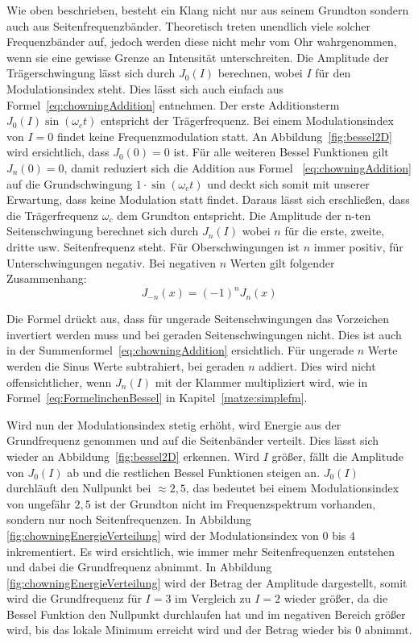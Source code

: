 Wie oben beschrieben, besteht ein Klang nicht nur aus seinem Grundton sondern auch aus Seitenfrequenzbänder. Theoretisch treten unendlich viele solcher Frequenzbänder auf, jedoch werden diese nicht mehr vom Ohr wahrgenommen, wenn sie eine gewisse Grenze an Intensität unterschreiten. Die Amplitude der Trägerschwingung lässt sich durch $J_0(I)$ berechnen, wobei $I$ für den Modulationsindex steht. Dies lässt sich auch einfach aus Formel~\ref{eq:chowningAddition} entnehmen. Der erste Additionsterm $J_0(I)\sin(\omega_c t)$ entspricht der Trägerfrequenz. Bei einem Modulationsindex von $I=0$ findet keine Frequenzmodulation statt. An Abbildung~\ref{fig:bessel2D} wird ersichtlich, dass $J_0(0)=0$ ist. Für alle weiteren Bessel Funktionen gilt $J_n(0)=0$, damit reduziert sich die Addition aus Formel~ \ref{eq:chowningAddition} auf die Grundschwingung $1\cdot\sin(\omega_c t)$ und deckt sich somit mit unserer Erwartung, dass keine Modulation statt findet. Daraus lässt sich erschließen, dass die Trägerfrequenz $\omega_c$ dem Grundton entspricht. Die Amplitude der n-ten Seitenschwingung berechnet sich durch $J_n(I)$ wobei $n$ für die erste, zweite, dritte usw. Seitenfrequenz steht. Für Oberschwingungen ist $n$ immer positiv, für Unterschwingungen negativ. Bei negativen $n$ Werten gilt folgender Zusammenhang: \cite[S. 223]{temme}
\begin{equation*}
J_{-n}(x)=(-1)^nJ_n(x)
\end{equation*}

Die Formel drückt aus, dass für ungerade Seitenschwingungen das Vorzeichen invertiert werden muss und bei geraden Seitenschwingungen nicht. Dies ist auch in der Summenformel~\ref{eq:chowningAddition} ersichtlich. Für ungerade $n$ Werte werden die Sinus Werte subtrahiert, bei geraden $n$ addiert. Dies wird nicht offensichtlicher, wenn $J_n(I)$ mit der Klammer multipliziert wird, wie in Formel~\ref{eq:FormelinchenBessel} in Kapitel~\ref{matze:simplefm}.

\label{bulli:besselModIndexZusammenahang}
Wird nun der Modulationsindex stetig erhöht, wird Energie aus der Grundfrequenz genommen und auf die Seitenbänder verteilt. Dies lässt sich wieder an Abbildung~\ref{fig:bessel2D} erkennen. Wird $I$ größer, fällt die Amplitude von $J_0(I)$ ab und die restlichen Bessel Funktionen steigen an. $J_0(I)$ durchläuft den Nullpunkt bei $\approx2,5$, das bedeutet bei einem Modulationsindex von ungefähr $2,5$ ist der Grundton nicht im Frequenzspektrum vorhanden, sondern nur noch Seitenfrequenzen. In Abbildung~ \ref{fig:chowningEnergieVerteilung} wird der Modulationsindex von $0$ bis $4$ inkrementiert. Es wird ersichtlich, wie immer mehr Seitenfrequenzen entstehen und dabei die Grundfrequenz abnimmt. In Abbildung~ \ref{fig:chowningEnergieVerteilung} wird der Betrag der Amplitude dargestellt, somit wird die Grundfrequenz für $I=3$ im Vergleich zu $I=2$ wieder größer, da die Bessel Funktion den Nullpunkt durchlaufen hat und im negativen Bereich größer wird, bis das lokale Minimum erreicht wird und der Betrag wieder bis $0$ abnimmt.

